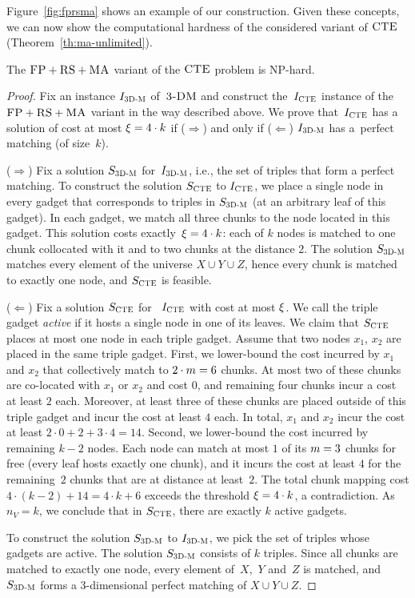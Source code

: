 Figure~\ref{fig:fprsma} shows an example of our construction.
Given these concepts, we can now show the computational hardness of the considered variant of $\textsc{CTE}$ (Theorem~\ref{th:ma-unlimited}).
\begin{theorem}
  The $\textsc{FP}+\textsc{RS}+\textsc{MA}$ variant of the $\textsc{CTE}$ problem is NP-hard.
  \label{th:ma-unlimited}
\end{theorem}
\begin{proof}
Fix an instance $I_{\mathrm{\textsc{3D-M}}}$ of~$\textsc{3-DM}$ and construct the~$I_{\mathrm{\textsc{CTE}}}$ instance of
the~$\textsc{FP}+\textsc{RS}+\textsc{MA}$ variant in the way described above. We prove that~$I_{\mathrm{\textsc{CTE}}}$ has a solution of cost at most $\xi = 4 \cdot k$ if ($\Rightarrow$) and only if
($\Leftarrow$)
$I_{\mathrm{\textsc{3D-M}}}$ has a~perfect matching (of size~$k$).

\medskip

($\Rightarrow$) Fix a solution $S_{\mathrm{\textsc{3D-M}}}$ for~$I_{\mathrm{\textsc{3D-M}}}$, i.e., the set of triples that form a perfect matching. To construct the solution $S_{\mathrm{\textsc{CTE}}}$ to $I_{\mathrm{\textsc{CTE}}}$, we place a single node in every
gadget that corresponds to triples in $S_{\mathrm{\textsc{3D-M}}}$ (at an arbitrary leaf of this gadget). In each gadget, we match all three chunks to the node located in this gadget. This
solution costs exactly~$\xi = 4\cdot k$: each of $k$ nodes is matched to one chunk collocated with it and to two chunks at the distance $2$.
The solution $S_{\mathrm{\textsc{3D-M}}}$ matches every element of the universe $X \cup Y \cup Z$, hence every chunk is matched to exactly one node, and $S_{\mathrm{\textsc{CTE}}}$ is feasible.

\medskip

($\Leftarrow$) Fix a solution $S_{\mathrm{\textsc{CTE}}}$ for ~$I_{\mathrm{\textsc{CTE}}}$ with cost at most $\xi$.
We call the triple gadget \emph{active} if it hosts a single node in one of its leaves.
We claim that $S_{\mathrm{\textsc{CTE}}}$ places at most one node in each triple gadget.
Assume that two nodes $x_1$, $x_2$ are placed in the same triple gadget.
First, we lower-bound the cost incurred by $x_1$ and $x_2$ that collectively match to $2\cdot m = 6$ chunks.
At most two of these chunks are co-located with $x_1$ or $x_2$ and cost $0$, and remaining four chunks incur a cost at least $2$ each.
Moreover, at least three of these chunks are placed outside of this triple gadget and incur the cost at least $4$ each.
In total, $x_1$ and $x_2$ incur the cost at least $2\cdot 0+2+3\cdot 4=14$.
Second, we lower-bound the cost incurred by remaining $k-2$ nodes.
Each node can match at most $1$ of its $m=3$ chunks for free (every leaf hosts exactly one chunk),
and it incurs the cost at least $4$ for the remaining~$2$ chunks that are at distance at least~$2$.
The total chunk mapping cost $4\cdot (k-2)+14 = 4\cdot k + 6$ exceeds the threshold $\xi = 4\cdot k$, a contradiction.
As $n_V = k$, we conclude that in $S_{\mathrm{\textsc{CTE}}}$, there are exactly $k$ active gadgets.

To construct the solution $S_{\mathrm{\textsc{3D-M}}}$ to $I_{\mathrm{\textsc{3D-M}}}$, we pick the set of triples whose gadgets are active.
The solution $S_{\mathrm{\textsc{3D-M}}}$ consists of $k$ triples.
Since all chunks are matched to exactly one node, every element of~$X$,~$Y$ and~$Z$ is matched, and $S_{\mathrm{\textsc{3D-M}}}$ forms a 3-dimensional perfect matching of $X \cup Y\cup Z$.
\end{proof}

